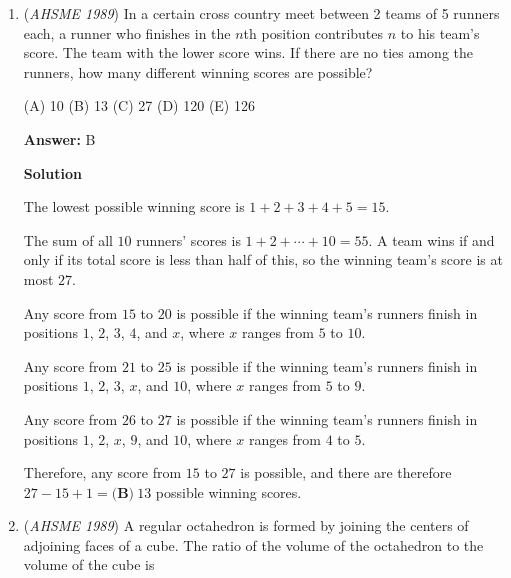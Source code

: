 \begin{enumerate}
 



\textbf{Solution 2}

Denote $T_n$ as the number of such pairs for $n$ people. Then for $T_{n-1}$, when we add an extra spot, we can either have a male or female giving two options. Note that these two options however double the value of $T_{n-1}$. Now if we note that $T_2=1$, we have that $T_5=8$, so that the answer is $\boxed{\textrm{(B)8}}$.

 


	\item (\textit{AHSME 1989}) In a certain cross country meet between 2 teams of 5 runners each, a runner who finishes in the $n$th position contributes $n$ to his team's score. The team with the lower score wins. If there are no ties among the runners, how many different winning scores are possible?


 (A) 10 (B) 13 (C) 27 (D) 120 (E) 126


 
 \textbf{Answer: }B



\textbf{Solution}

The lowest possible winning score is $1 + 2 + 3 + 4 + 5 = 15$.

 The sum of all $10$ runners' scores is $1 + 2 + \cdots + 10 = 55$.  A team wins if and only if its total score is less than half of this, so the winning team's score is at most $27$. 

 Any score from $15$ to $20$ is possible if the winning team's runners finish in positions $1$, $2$, $3$, $4$, and $x$, where $x$ ranges from $5$ to $10$.

 Any score from $21$ to $25$ is possible if the winning team's runners finish in positions $1$, $2$, $3$, $x$, and $10$, where $x$ ranges from $5$ to $9$.

 Any score from $26$ to $27$ is possible if the winning team's runners finish in positions $1$, $2$, $x$, $9$, and $10$, where $x$ ranges from $4$ to $5$.

 Therefore, any score from $15$ to $27$ is possible, and there are therefore $27 - 15 + 1 = \boxed{\textbf{(B)}\ 13}$ possible winning scores.

 


	\item (\textit{AHSME 1989}) A regular octahedron is formed by joining the centers of adjoining faces of a cube. The ratio of the volume of the octahedron to the volume of the cube is



\end{enumerate}
